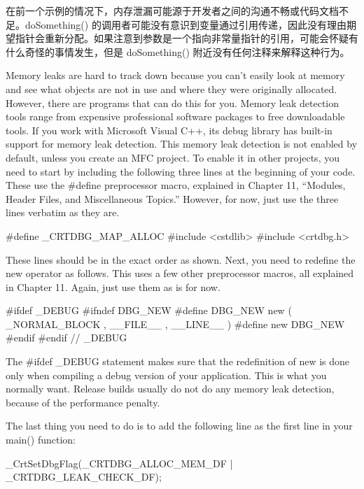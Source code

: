 在前一个示例的情况下，内存泄漏可能源于开发者之间的沟通不畅或代码文档不足。doSomething() 的调用者可能没有意识到变量通过引用传递，因此没有理由期望指针会重新分配。如果注意到参数是一个指向非常量指针的引用，可能会怀疑有什么奇怪的事情发生，但是 doSomething() 附近没有任何注释来解释这种行为。


Memory leaks are hard to track down because you can’t easily look at memory and see what objects are not in use and where they were originally allocated. However, there are programs that can do this for you. Memory leak detection tools range from expensive professional software packages to free downloadable tools. If you work with Microsoft Visual C++, its debug library has built-in support for memory leak detection. This memory leak detection is not enabled by default, unless you create an MFC project. To enable it in other projects, you need to start by including the following three lines at the beginning of your code. These use the \#define preprocessor macro, explained in Chapter 11, “Modules, Header Files, and Miscellaneous Topics.” However, for now, just use the three lines verbatim as they are.

\begin{cpp}
#define _CRTDBG_MAP_ALLOC
#include <cstdlib>
#include <crtdbg.h>
\end{cpp}

These lines should be in the exact order as shown. Next, you need to redefine the new operator as follows. This uses a few other preprocessor macros, all explained in Chapter 11. Again, just use them as is for now.

\begin{cpp}
#ifdef _DEBUG
    #ifndef DBG_NEW
        #define DBG_NEW new ( _NORMAL_BLOCK , __FILE__ , __LINE__ )
        #define new DBG_NEW
    #endif
#endif // _DEBUG
\end{cpp}

The \#ifdef \_DEBUG statement makes sure that the redefinition of new is done only when compiling a debug version of your application. This is what you normally want. Release builds usually do not do any memory leak detection, because of the performance penalty.

The last thing you need to do is to add the following line as the first line in your main() function:

\begin{cpp}
_CrtSetDbgFlag(_CRTDBG_ALLOC_MEM_DF | _CRTDBG_LEAK_CHECK_DF);
\end{cpp}

